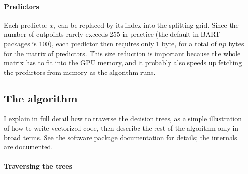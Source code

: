 \documentclass{article}
\begin{document}
    \paragraph{Predictors}

    Each predictor $x_i$ can be replaced by its index into the splitting grid. Since the number of cutpoints rarely exceeds 255 in practice (the default in BART packages is 100), each predictor then requires only 1 byte, for a total of $np$ bytes for the matrix of predictors. This size reduction is important because the whole matrix has to fit into the GPU memory, and it probably also speeds up fetching the predictors from memory as the algorithm runs.

    \subsection{The algorithm}

    I explain in full detail how to traverse the decision trees, as a simple illustration of how to write vectorized code, then describe the rest of the algorithm only in broad terms. See the software package documentation for details; the internals are documented.

    \paragraph{Traversing the trees}
\end{document}

